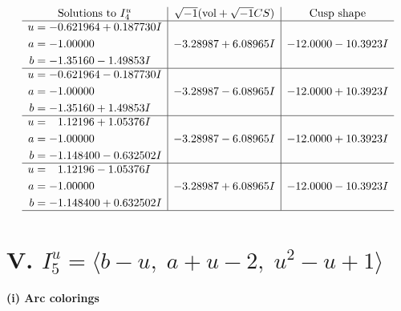 \documentclass[1p]{elsarticle_modified}
\theoremstyle{definition}
\newcommand{\I}{\sqrt{-1}}
\begin{document}
$$\begin{array}{c|c|c}  
\text{Solutions to }I^u_{4}& \I (\text{vol} + \sqrt{-1}CS) & \text{Cusp shape}\\
 \hline 
\begin{aligned}
u &= -0.621964 + 0.187730 I \\
a &= -1.00000\phantom{ +0.000000I} \\
b &= -1.35160 - 1.49853 I\end{aligned}
 & -3.28987 + 6.08965 I & -12.0000 - 10.3923 I \\ \hline\begin{aligned}
u &= -0.621964 - 0.187730 I \\
a &= -1.00000\phantom{ +0.000000I} \\
b &= -1.35160 + 1.49853 I\end{aligned}
 & -3.28987 - 6.08965 I & -12.0000 + 10.3923 I \\ \hline\begin{aligned}
u &= \phantom{-}1.12196 + 1.05376 I \\
a &= -1.00000\phantom{ +0.000000I} \\
b &= -1.148400 - 0.632502 I\end{aligned}
 & -3.28987 - 6.08965 I & -12.0000 + 10.3923 I \\ \hline\begin{aligned}
u &= \phantom{-}1.12196 - 1.05376 I \\
a &= -1.00000\phantom{ +0.000000I} \\
b &= -1.148400 + 0.632502 I\end{aligned}
 & -3.28987 + 6.08965 I & -12.0000 - 10.3923 I\\
 \hline 
 \end{array}$$\newpage\newpage\renewcommand{\arraystretch}{1}
\centering \section*{V. $I^u_{5}= \langle b- u,\;a+u-2,\;u^2- u+1 \rangle$}
\flushleft \textbf{(i) Arc colorings}\\
\end{document}
